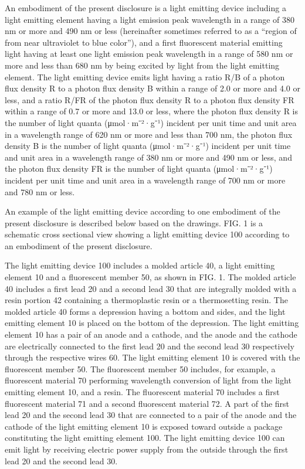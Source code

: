 \documentclass[11pt,a4paper]{article}
\begin{document}
An embodiment of the present disclosure is a light emitting device including a light emitting element having a light emission peak wavelength in a range of 380 nm or more and 490 nm or less (hereinafter sometimes referred to as a “region of from near ultraviolet to blue color”), and a first fluorescent material emitting light having at least one light emission peak wavelength in a range of 580 nm or more and less than 680 nm by being excited by light from the light emitting element. The light emitting device emits light having a ratio R/B of a photon flux density R to a photon flux density B within a range of 2.0 or more and 4.0 or less, and a ratio R/FR of the photon flux density R to a photon flux density FR within a range of 0.7 or more and 13.0 or less, where the photon flux density R is the number of light quanta (μmol·m⁻²·g⁻¹) incident per unit time and unit area in a wavelength range of 620 nm or more and less than 700 nm, the photon flux density B is the number of light quanta (μmol·m⁻²·g⁻¹) incident per unit time and unit area in a wavelength range of 380 nm or more and 490 nm or less, and the photon flux density FR is the number of light quanta (μmol·m⁻²·g⁻¹) incident per unit time and unit area in a wavelength range of 700 nm or more and 780 nm or less.

An example of the light emitting device according to one embodiment of the present disclosure is described below based on the drawings. FIG. 1 is a schematic cross sectional view showing a light emitting device 100 according to an embodiment of the present disclosure.

The light emitting device 100 includes a molded article 40, a light emitting element 10 and a fluorescent member 50, as shown in FIG. 1. The molded article 40 includes a first lead 20 and a second lead 30 that are integrally molded with a resin portion 42 containing a thermoplastic resin or a thermosetting resin. The molded article 40 forms a depression having a bottom and sides, and the light emitting element 10 is placed on the bottom of the depression. The light emitting element 10 has a pair of an anode and a cathode, and the anode and the cathode are electrically connected to the first lead 20 and the second lead 30 respectively through the respective wires 60. The light emitting element 10 is covered with the fluorescent member 50. The fluorescent member 50 includes, for example, a fluorescent material 70 performing wavelength conversion of light from the light emitting element 10, and a resin. The fluorescent material 70 includes a first fluorescent material 71 and a second fluorescent material 72. A part of the first lead 20 and the second lead 30 that are connected to a pair of the anode and the cathode of the light emitting element 10 is exposed toward outside a package constituting the light emitting element 100. The light emitting device 100 can emit light by receiving electric power supply from the outside through the first lead 20 and the second lead 30.
\end{document}
